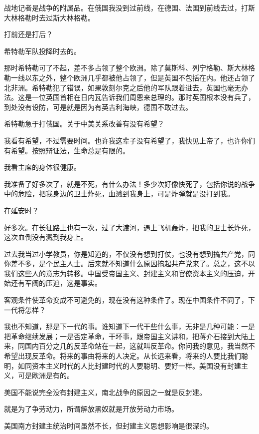 战地记者是战争的附属品。在俄国我没到过前线，在德国、法国到前线去过，打斯大林格勒时去过斯大林格勒。

打前还是打后？

希特勒军队投降时去的。

那时希特勒可了不起，差不多占领了整个欧洲。除了莫斯科、列宁格勒、斯大林格勒一线以东之外，整个欧洲几乎都被他占领了，但是英国不包括在内。他还占领了北非洲。希特勒犯了错误，如果敦刻尔克之后他的军队跟着进去，英国也毫无办法。这是一位英国首相在日内瓦告诉我们周恩来总理的。那时英国根本没有兵了，到处没有设防，可是就是因为有英吉利海峡，德国不敢过去。

希特勒急于打俄国。关于中美关系改善有没有希望？

我看有希望，不过需要时间。也许我这辈子没有希望了，我快见上帝了，也许你们有希望。按照辩证法，生命总是有限的。

我看主席的身体很健康。

我准备了好多次了，就是不死，有什么办法！多少次好像快死了，包括你说的战争中的危险，把我身边的卫士炸死，血溅到我身上，可是炸弹就是没打到我。

在延安时？

好多次。在长征路上也有一次，过了大渡河，遇上飞机轰炸，把我的卫士长炸死，这次血倒没有溅到我身上。

过去我当过小学教员，你是知道的，不仅没有想到打仗，也没有想到搞共产党，同你差不多，是个民主人士。后来就不知道什么原因搞起共产党来了。总之，这不以我们这些人的意志为转移。中国受帝国主义、封建主义和官僚资本主义的压迫，开始还有军阀的压迫，这是事实。

客观条件使革命变成不可避免的，现在没有这种条件了。现在中国条件不同了，下一代将怎样？

我也不知道，那是下一代的事。谁知道下一代干些什么事，无非是几种可能：一是把革命继续发展；一是否定革命，干坏事，跟帝国主义讲和，把蒋介石接到大陆上来，同国内百分之几的反革命站在一起，这就叫反革命。你问我的意见，我当然不希望出现反革命。将来的事由将来的人决定。从长远来看，将来的人要比我们聪明，如同资本主义时代的人比封建时代的人要聪明、要好一样。美国没有封建主义，可是欧洲是有的。

美国不能说完全没有封建主义，南北战争的原因之一就是反封建。

就是为了争劳动力，所谓解放黑奴就是开放劳动力市场。

美国南方封建主统治时间虽然不长，但封建主义思想影响是很深的。


